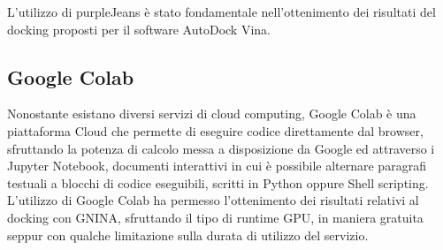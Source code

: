 L'utilizzo di purpleJeans è stato fondamentale nell'ottenimento dei risultati del docking proposti per il software AutoDock Vina.

\subsection{Google Colab}
Nonostante esistano diversi servizi di cloud computing, Google Colab è una piattaforma Cloud che permette di eseguire codice direttamente dal browser, sfruttando la potenza di calcolo messa a disposizione da Google ed attraverso i Jupyter Notebook, documenti interattivi in cui è possibile alternare paragrafi testuali a blocchi di codice eseguibili, scritti in Python oppure Shell scripting. 
L'utilizzo di Google Colab ha permesso l'ottenimento dei risultati relativi al docking con GNINA, sfruttando il tipo di runtime GPU, in maniera gratuita seppur con qualche limitazione sulla durata di utilizzo del servizio. 
